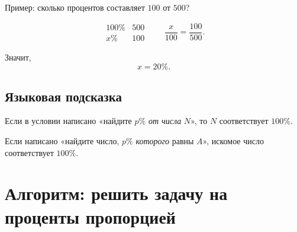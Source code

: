 \documentclass[a4paper,12pt]{article}
\begin{document}
Пример: сколько процентов составляет $100$ от $500$?

\[
\begin{array}{c|c}
100\% & 500\\
x\% & 100
\end{array}
\qquad
\frac{x}{100}
=
\frac{100}{500}.
\]

Значит,
\[
x=20\%.
\]

\subsection*{Языковая подсказка}

Если в условии написано
«найдите $p\%$ \emph{от числа} $N$»,
то $N$ соответствует $100\%$.

Если написано
«найдите число, $p\%$ \emph{которого} равны $A$»,
искомое число соответствует $100\%$.

\clearpage

\section*{Алгоритм: решить задачу на проценты пропорцией}
\end{document}
